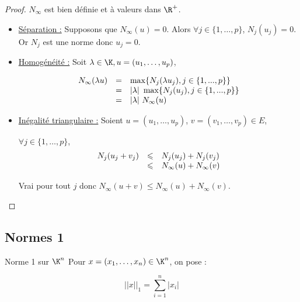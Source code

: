 \begin{proof}
    $N_\infty$ est bien définie et à valeurs dans $\R^+$.

    \begin{itemize}
        \item \uline{Séparation :}
        Supposons que $N_\infty(u) = 0$. 
        Alors $\forall j \in \{1, \dots, p\}$, $N_j(u_j) = 0$. 
        Or $N_j$ est une norme donc $u_j = 0$.

        \item \uline{Homogénéité :}
        Soit $\lambda \in \K, u = (u_1, \dots, u_p)$,

        \[
            \begin{array}{rcl}
                N_\infty(\lambda u) & = & \max\{N_j(\lambda u_j), j \in \{1, ..., p\}\} \\
                \space & = & |\lambda| ~ \max\{N_j(u_j), j \in \{1, ..., p\}\} \\
                \space & = & |\lambda| ~ N_\infty(u) \\
            \end{array}
        \]

        \item \uline{Inégalité triangulaire :}
        Soient $u = (u_1, \dots, u_p)$, $v = (v_1, \dots, v_p) \in E$,

        $\forall j \in \{1, \dots, p\}$,
        \[
            \begin{array}{rcl}
                N_j(u_j + v_j) & \leqslant & N_j(u_j) + N_j(v_j) \\
                \space & \leqslant & N_\infty(u) + N_\infty(v) \\
            \end{array}
        \]

            Vrai pour tout $j$ donc $N_\infty(u + v) \leqslant N_\infty(u) + N_\infty(v)$.
    \end{itemize}
\end{proof}

\subsection{Normes 1}

\begin{definition}{Norme 1 sur $\K^n$}{}
    Pour $x = (x_1, \dots, x_n) \in \K^n$, on pose :

    \[||x||_1 = \sum_{i = 1 }^{n } |x_i|\]
\end{definition}

